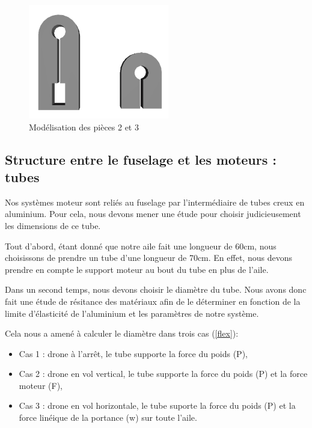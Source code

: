 \documentclass[a4paper,12pt,french]{report}
\begin{document}
\begin{figure}[h]
    \centering
    \includegraphics[height=5cm]{figures/mot2.png}
    \caption{Modélisation des pièces 2 et 3}
\end{figure}

\newpage
\subsection{Structure entre le fuselage et les moteurs : tubes}

Nos systèmes moteur sont reliés au fuselage par l'intermédiaire de tubes creux en aluminium. Pour cela, nous devons mener une étude pour choisir judicieusement les dimensions de ce tube.\newline

Tout d'abord, étant donné que notre aile fait une longueur de 60cm, nous choisissons de prendre un tube d'une longueur de 70cm. En effet, nous devons prendre en compte  le support moteur au bout du tube en plus de l'aile.\newline

Dans un second temps, nous devons choisir le diamètre du tube. Nous avons donc fait une étude de résitance des matériaux afin de le déterminer en fonction de la limite d'élasticité de l'aluminium et les paramètres de notre système.\newline

Cela nous a amené à calculer le diamètre dans trois cas (\ref{flex}):
\begin{itemize}
    \item Cas 1 : drone à l'arrêt, le tube supporte la force du poids (P),
    \item Cas 2 : drone en vol vertical, le tube supporte la force du poids (P) et la force moteur (F),
    \item Cas 3 : drone en vol horizontale, le tube suporte la force du poids (P) et la force linéique de la portance (w) sur toute l'aile.
\end{itemize}
\end{document}
